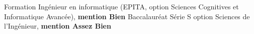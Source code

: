 \begin{rubric}{Formation}
	\entry*[2003-2008~~~~~~~~~~~~~~~~~~~~] Ingénieur en informatique (EPITA, option Sciences Cognitives et Informatique Avancée), \textbf{mention Bien}
	\entry*[Juin 2003] Baccalauréat Série S option Sciences de l'Ingénieur, \textbf{mention Assez Bien}
\end{rubric}
